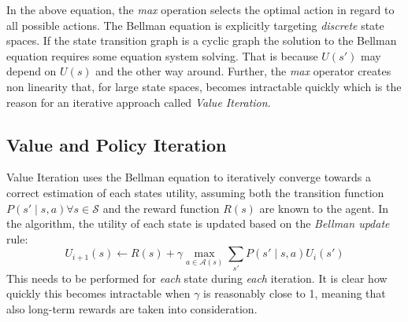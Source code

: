 In the above equation, the \emph{max} operation selects the optimal action in regard to all possible actions. The
Bellman equation is explicitly targeting \emph{discrete} state spaces. If the state transition graph is a cyclic graph
the solution to the Bellman equation requires some equation system solving. That is because $U(s')$ may depend on $U(s)$
and the other way around. Further, the \emph{max} operator creates non linearity that, for large state spaces, becomes
intractable quickly which is the reason for an iterative approach called \emph{Value Iteration}.







\subsection{Value and Policy Iteration}%
\label{sub:policy_and_value_iteration}

Value Iteration uses the Bellman equation to iteratively converge towards a correct estimation of each states utility,
assuming both the transition function $P(s' \mid s,a) \forall s \in \mathcal{S}$ and the reward function $R(s)$ are
known to the agent.
In the algorithm, the utility of each state is updated based on the \emph{Bellman update} rule:
\begin{equation}
    U_{i+1}(s) \gets R(s) + \gamma \max_{a \in \mathcal{A}(s)} \sum_{s'}{P(s' \mid s,a) U_i(s')}
\end{equation}
This needs to be performed for \emph{each} state during \emph{each} iteration. It is clear how quickly this becomes
intractable when $\gamma$ is reasonably close to 1, meaning that also long-term rewards are taken into
consideration.

